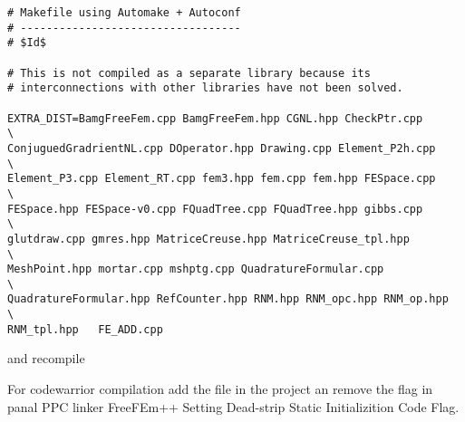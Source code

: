 \begin{verbatim}
# Makefile using Automake + Autoconf                                                             
# ----------------------------------                                                             
# $Id$                                      

# This is not compiled as a separate library because its                                         
# interconnections with other libraries have not been solved.                                    

EXTRA_DIST=BamgFreeFem.cpp BamgFreeFem.hpp CGNL.hpp CheckPtr.cpp        \
ConjuguedGradrientNL.cpp DOperator.hpp Drawing.cpp Element_P2h.cpp      \
Element_P3.cpp Element_RT.cpp fem3.hpp fem.cpp fem.hpp FESpace.cpp      \
FESpace.hpp FESpace-v0.cpp FQuadTree.cpp FQuadTree.hpp gibbs.cpp        \
glutdraw.cpp gmres.hpp MatriceCreuse.hpp MatriceCreuse_tpl.hpp          \
MeshPoint.hpp mortar.cpp mshptg.cpp QuadratureFormular.cpp              \
QuadratureFormular.hpp RefCounter.hpp RNM.hpp RNM_opc.hpp RNM_op.hpp    \
RNM_tpl.hpp   FE_ADD.cpp

\end{verbatim}

and recompile  

 
 
For codewarrior compilation add the file in the project an remove the flag
in panal  PPC linker FreeFEm++ Setting Dead-strip Static Initializition Code Flag.
